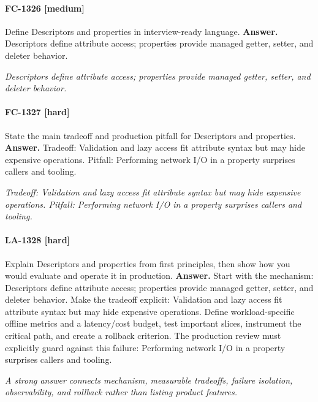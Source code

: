 \paragraph{FC-1326 [medium]} Define Descriptors and properties in interview-ready language.
\noindent\textbf{Answer.} Descriptors define attribute access; properties provide managed getter, setter, and deleter behavior.
\par\textit{Descriptors define attribute access; properties provide managed getter, setter, and deleter behavior.}
\paragraph{FC-1327 [hard]} State the main tradeoff and production pitfall for Descriptors and properties.
\noindent\textbf{Answer.} Tradeoff: Validation and lazy access fit attribute syntax but may hide expensive operations. Pitfall: Performing network I/O in a property surprises callers and tooling.
\par\textit{Tradeoff: Validation and lazy access fit attribute syntax but may hide expensive operations. Pitfall: Performing network I/O in a property surprises callers and tooling.}
\paragraph{LA-1328 [hard]} Explain Descriptors and properties from first principles, then show how you would evaluate and operate it in production.
\noindent\textbf{Answer.} Start with the mechanism: Descriptors define attribute access; properties provide managed getter, setter, and deleter behavior. Make the tradeoff explicit: Validation and lazy access fit attribute syntax but may hide expensive operations. Define workload-specific offline metrics and a latency/cost budget, test important slices, instrument the critical path, and create a rollback criterion. The production review must explicitly guard against this failure: Performing network I/O in a property surprises callers and tooling.
\par\textit{A strong answer connects mechanism, measurable tradeoffs, failure isolation, observability, and rollback rather than listing product features.}
